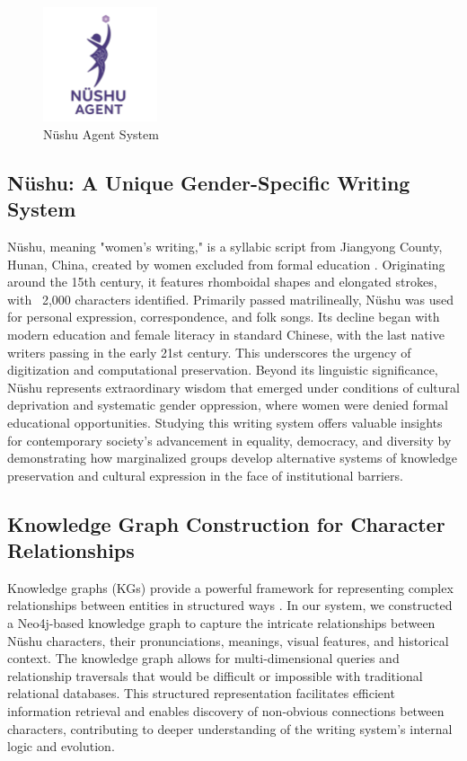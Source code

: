 \documentclass{article}
\begin{document}
    \begin{figure}[htb]
    \centering
    \includegraphics[width=0.3\textwidth]{images/nvshu_agent_logo.png}
    \caption{N\"{u}shu Agent System}
    \label{fig:nvshu_agent_logo}
    \end{figure}
    
\subsection{N\"{u}shu: A Unique Gender-Specific Writing System}
\label{ssec:nushu}
    N\"{u}shu, meaning "women's writing," is a syllabic script from Jiangyong County, Hunan, China, created by women excluded from formal education \cite{chen2006nuhanzi}. Originating around the 15th century, it features rhomboidal shapes and elongated strokes, with ~2,000 characters identified. 
    Primarily passed matrilineally, N\"{u}shu was used for personal expression, correspondence, and folk songs. Its decline began with modern education and female literacy in standard Chinese, with the last native writers passing in the early 21st century. This underscores the urgency of digitization and computational preservation.
    Beyond its linguistic significance, N\"{u}shu represents extraordinary wisdom that emerged under conditions of cultural deprivation and systematic gender oppression, where women were denied formal educational opportunities. Studying this writing system offers valuable insights for contemporary society's advancement in equality, democracy, and diversity by demonstrating how marginalized groups develop alternative systems of knowledge preservation and cultural expression in the face of institutional barriers.

\subsection{Knowledge Graph Construction for Character Relationships}
\label{ssec:kg_intro}
    Knowledge graphs (KGs) provide a powerful framework for representing complex relationships between entities in structured ways \cite{hoganKnowledgeGraphs2022}. In our system, we constructed a Neo4j-based knowledge graph to capture the intricate relationships between N\"{u}shu characters, their pronunciations, meanings, visual features, and historical context.
    The knowledge graph allows for multi-dimensional queries and relationship traversals that would be difficult or impossible with traditional relational databases. This structured representation facilitates efficient information retrieval and enables discovery of non-obvious connections between characters, contributing to deeper understanding of the writing system's internal logic and evolution.
\end{document}
